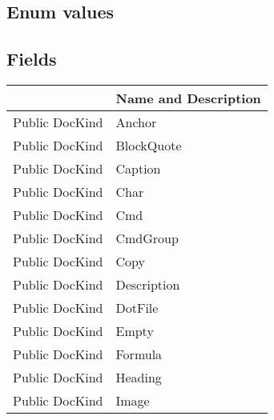 \documentclass[11pt, oneside, a4paper]{book}
\begin{document}
\subsection{Enum values}

\subsection{Fields}
\begin{center}
\begin{tabular}{| p{3cm} | p{12cm} | }
\hline
\textbf{ } & \textbf{ Name and Description}\\
\hline
 Public  DocKind &  Anchor\hypertarget{SoftwareEngineeringTools.{}Documentation.{}DocKind.{}Anchor}{}\\
\hline
 Public  DocKind &  BlockQuote\hypertarget{SoftwareEngineeringTools.{}Documentation.{}DocKind.{}BlockQuote}{}\\
\hline
 Public  DocKind &  Caption\hypertarget{SoftwareEngineeringTools.{}Documentation.{}DocKind.{}Caption}{}\\
\hline
 Public  DocKind &  Char\hypertarget{SoftwareEngineeringTools.{}Documentation.{}DocKind.{}Char}{}\\
\hline
 Public  DocKind &  Cmd\hypertarget{SoftwareEngineeringTools.{}Documentation.{}DocKind.{}Cmd}{}\\
\hline
 Public  DocKind &  CmdGroup\hypertarget{SoftwareEngineeringTools.{}Documentation.{}DocKind.{}CmdGroup}{}\\
\hline
 Public  DocKind &  Copy\hypertarget{SoftwareEngineeringTools.{}Documentation.{}DocKind.{}Copy}{}\\
\hline
 Public  DocKind &  Description\hypertarget{SoftwareEngineeringTools.{}Documentation.{}DocKind.{}Description}{}\\
\hline
 Public  DocKind &  DotFile\hypertarget{SoftwareEngineeringTools.{}Documentation.{}DocKind.{}DotFile}{}\\
\hline
 Public  DocKind &  Empty\hypertarget{SoftwareEngineeringTools.{}Documentation.{}DocKind.{}Empty}{}\\
\hline
 Public  DocKind &  Formula\hypertarget{SoftwareEngineeringTools.{}Documentation.{}DocKind.{}Formula}{}\\
\hline
 Public  DocKind &  Heading\hypertarget{SoftwareEngineeringTools.{}Documentation.{}DocKind.{}Heading}{}\\
\hline
 Public  DocKind &  Image\hypertarget{SoftwareEngineeringTools.{}Documentation.{}DocKind.{}Image}{}\\

\end{tabular}
\end{center}
\end{document}
